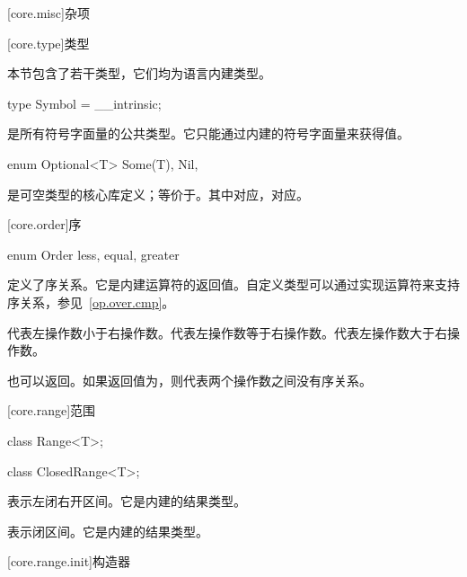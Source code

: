 
[core.misc]{杂项}

[core.type]{类型}

\pnum
本节包含了若干类型，它们均为语言内建类型。

\begin{itemdecl}
type Symbol = __intrinsic;
\end{itemdecl}

\pnum
{}是所有符号字面量的公共类型。它只能通过内建的符号字面量来获得值。

\begin{itemdecl}
enum Optional<T> {
    Some(T),
    Nil,
}
\end{itemdecl}

\pnum
{}是可空类型的核心库定义；等价于。其中对应，对应。

[core.order]{序}

\begin{itemdecl}
enum Order {
    less,
    equal,
    greater
}
\end{itemdecl}

\pnum
{}定义了序关系。它是内建运算符的返回值。自定义类型可以通过实现运算符来支持序关系，参见~\ref{op.over.cmp}。

\pnum
{}代表左操作数小于右操作数。代表左操作数等于右操作数。代表左操作数大于右操作数。

\pnum
{}也可以返回。如果返回值为，则代表两个操作数之间没有序关系。

[core.range]{范围}

\begin{itemdecl}
class Range<T>;
\end{itemdecl}

\begin{itemdecl}
class ClosedRange<T>;
\end{itemdecl}

\pnum
{}表示左闭右开区间。它是内建的结果类型。

\pnum
{}表示闭区间。它是内建的结果类型。

[core.range.init]{构造器}


